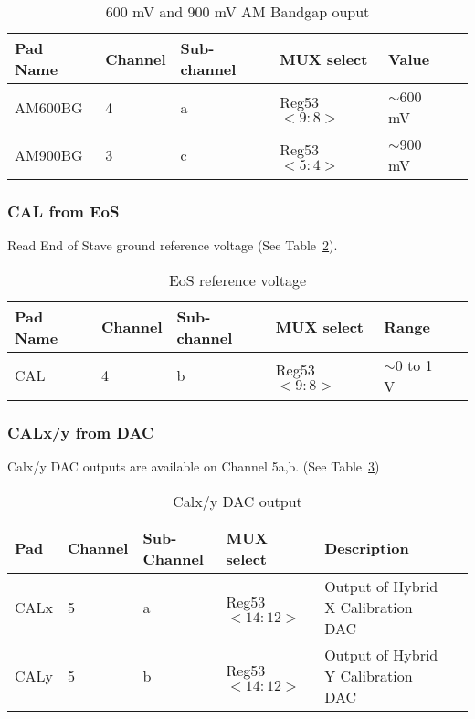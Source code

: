 \documentclass[11pt]{article}   			%
\begin{document}
\begin{table}[h]
  \begin{center}
\begin{tabular}{|l|l|l|l|l|l|}
\hline
{\bf Pad Name} & {\bf Channel} & {\bf Sub-channel} & {\bf MUX select} & {\bf Value} \\
\hline
AM600BG & 4 & a & Reg53$<9:8>$ & $\sim$600 mV\\
\hline
AM900BG & 3 & c & Reg53$<5:4>$ & $\sim$900 mV\\
\hline
\end{tabular}
\caption{600 mV and 900 mV AM Bandgap ouput}
\label{tab:ambgo}
\end{center}
\end{table}

\subsubsection{CAL from EoS}
Read End of Stave ground reference voltage (See Table~\ref{tab:eos}).

\begin{table}[h]
\begin{center}
\begin{tabular}{|l|l|l|l|l|l|}
\hline
{\bf Pad Name} & {\bf Channel} & {\bf Sub-channel} & {\bf MUX select} & {\bf Range} \\
\hline
CAL & 4 & b & Reg53$<9:8>$ & $\sim$0 to 1 V\\
\hline
\end{tabular}
\caption{EoS reference voltage}
\label{tab:eos}
\end{center}
\end{table}

\subsubsection{CALx/y from DAC}
Calx/y DAC outputs are available on Channel 5a,b. (See Table~\ref{tab:calxy})
\begin{table}[h]
\begin{center}
\begin{tabular}{|l|l|l|l|l|l|}
\hline
{\bf Pad} & {\bf Channel} & {\bf Sub-Channel} & {\bf MUX select} & {\bf Description}\\
\hline
CALx & 5 & a & Reg53$<14:12>$ & Output of Hybrid X Calibration DAC\\
\hline
CALy & 5 & b & Reg53$<14:12>$ & Output of Hybrid Y Calibration DAC\\
\hline
\end{tabular}
\caption{Calx/y DAC output}
\label{tab:calxy}
\end{center}
\end{table}
\end{document}
